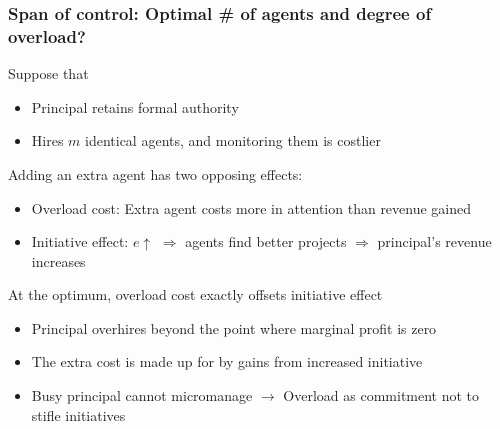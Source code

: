 \documentclass[aspectratio=169]{beamer}
\begin{document}
\begin{frame}
\frametitle{Span of control: Optimal \# of agents and degree of overload?}
Suppose that 
\begin{itemize}\setlength\itemsep{3pt}
  \item Principal retains formal authority 
  \item Hires $m$ identical agents, and monitoring them is costlier
\end{itemize}\medskip
Adding an extra agent has two opposing effects:
\begin{itemize}\setlength\itemsep{3pt}
\item Overload cost: Extra agent costs more in attention than revenue gained
\item Initiative effect: $e\uparrow$ $\Rightarrow$ agents find better projects $\Rightarrow$ principal's revenue increases
\end{itemize}\medskip
At the optimum, overload cost exactly offsets initiative effect
\begin{itemize}\setlength\itemsep{3pt}
\item Principal overhires beyond the point where marginal profit is zero 
\item The extra cost is made up for by gains from increased initiative
\item Busy principal cannot micromanage  $\to$ Overload as commitment not to stifle initiatives
\end{itemize}
\end{frame}
\end{document}
